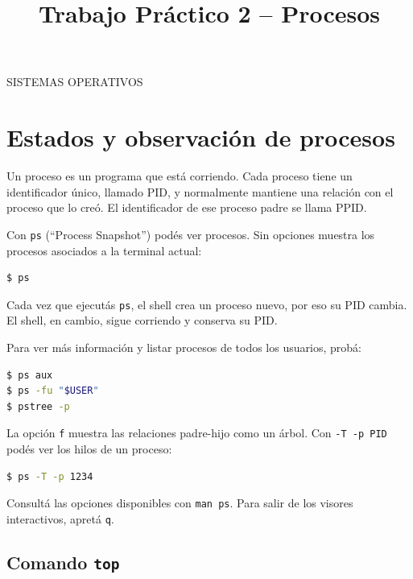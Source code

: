 \documentclass[11pt,a4paper]{article}
\title{Trabajo Práctico 2 -- Procesos}
\author{}
\date{}
\begin{document}
\maketitle
\thispagestyle{fancy}
\begin{center}
SISTEMAS OPERATIVOS
\end{center}
\newpage

\tableofcontents
\newpage

\section{Estados y observación de procesos}

Un proceso es un programa que está corriendo. Cada proceso tiene un identificador único, llamado PID, y normalmente mantiene una relación con el proceso que lo creó. El identificador de ese proceso padre se llama PPID.

Con \texttt{ps} (``Process Snapshot'') podés ver procesos. Sin opciones muestra los procesos asociados a la terminal actual:

\begin{lstlisting}[language=bash]
$ ps
\end{lstlisting}

Cada vez que ejecutás \texttt{ps}, el shell crea un proceso nuevo, por eso su PID cambia. El shell, en cambio, sigue corriendo y conserva su PID.

Para ver más información y listar procesos de todos los usuarios, probá:

\begin{lstlisting}[language=bash]
$ ps aux
$ ps -fu "$USER"
$ pstree -p
\end{lstlisting}

La opción \texttt{f} muestra las relaciones padre-hijo como un árbol. Con \texttt{-T -p PID} podés ver los hilos de un proceso:

\begin{lstlisting}[language=bash]
$ ps -T -p 1234
\end{lstlisting}

\begin{infobox}
Consultá las opciones disponibles con \texttt{man ps}. Para salir de los visores interactivos, apretá \texttt{q}.
\end{infobox}

\subsection{Comando \texttt{top}}
\end{document}
